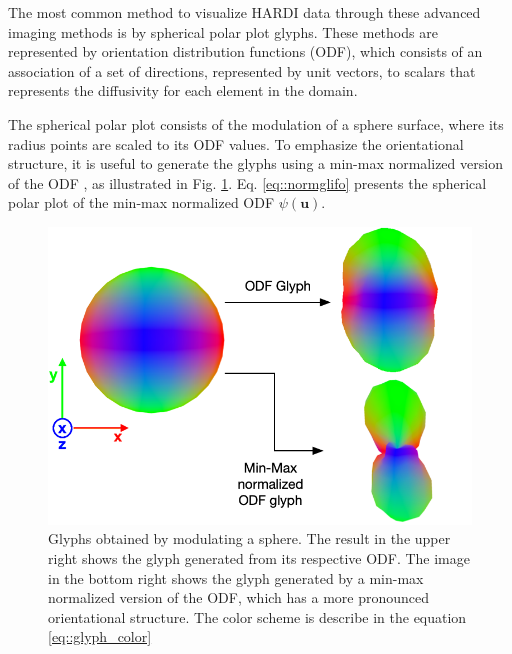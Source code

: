 \documentclass[twoside,twocolumn,10pt]{article}
\begin{document}
The most common method to visualize HARDI data through these advanced imaging methods is by spherical polar plot glyphs. These methods are represented by orientation distribution functions (ODF), which consists of an association of a set of directions, represented by unit vectors, to scalars that represents the diffusivity for each element in the domain.

The spherical polar plot consists of the modulation of a sphere surface, where its radius points are scaled to its ODF values. To emphasize the orientational structure, it is useful to generate the glyphs using a min-max normalized version of the ODF \cite{TuchQBall2004}, as illustrated in Fig. \ref{fig::intro_glyph}. Eq. \ref{eq::normglifo} presents the spherical polar plot of the min-max normalized ODF $\psi(\bm{u})$.

\begin{figure}[htb]
    \centering
    \includegraphics[width=1.00\linewidth, angle=0]{figs/SphericalMeshModulation.png}
    \caption{Glyphs obtained by modulating a sphere. The result in the upper right shows the glyph generated from its respective ODF. The image in the bottom right shows the glyph generated by a min-max normalized version of the ODF, which has a more pronounced orientational structure. The color scheme is describe in the equation \ref{eq::glyph_color}}
    \label{fig::intro_glyph}
\end{figure}

\end{document}
